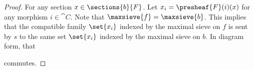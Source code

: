 
\begin{proof}
For any section $x \in \sections{b}{F}$.
Let $x_i = \presheaf{F}(i)(x)$ for any morphism $i \in \cat{C}$. 
Note that $\maxsieve{f} = \maxsieve{b}$.
This implies that the compatible family $\set{x_i}$ indexed by the maximal sieve on $f$
is sent by $s$ to the same set $\set{x_i}$ indexed by the maximal sieve on $b$.
In diagram form, that

\begin{center}
\end{center}

commutes.
\end{proof}